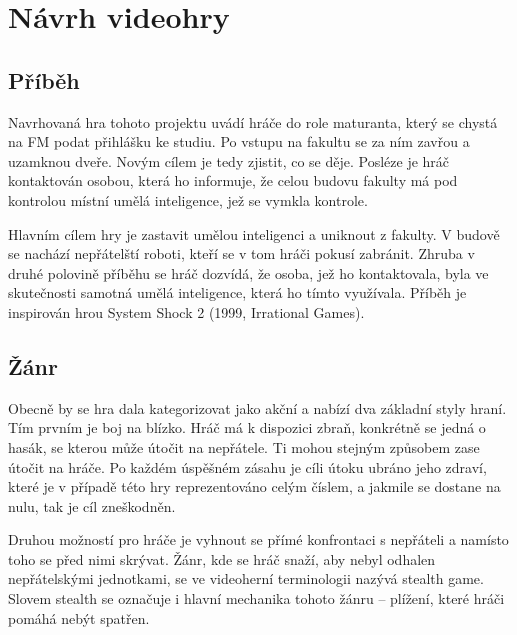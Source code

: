 \documentclass[FM,Proj]{tulthesis}
\begin{document}
	\chapter{Návrh videohry}
	
	\section{Příběh}
	
	Navrhovaná hra tohoto projektu uvádí hráče do role maturanta, který se chystá na FM podat přihlášku ke studiu. Po vstupu na fakultu se za ním zavřou a uzamknou dveře. Novým cílem je tedy zjistit, co se děje. Posléze je hráč kontaktován osobou, která ho informuje, že celou budovu fakulty má pod kontrolou místní umělá inteligence, jež se vymkla kontrole.
	
	Hlavním cílem hry je zastavit umělou inteligenci a uniknout z fakulty. V budově se nachází nepřátelští roboti, kteří se v tom hráči pokusí zabránit. Zhruba v druhé polovině příběhu se hráč dozvídá, že osoba, jež ho kontaktovala, byla ve skutečnosti samotná umělá inteligence, která ho tímto využívala. Příběh je inspirován hrou System Shock 2 (1999, Irrational Games).
	
	\section{Žánr}
	
	Obecně by se hra dala kategorizovat jako akční a nabízí dva základní styly hraní. Tím prvním je boj na blízko. Hráč má k dispozici zbraň, konkrétně se jedná o hasák, se kterou může útočit na nepřátele. Ti mohou stejným způsobem zase útočit na hráče. Po každém úspěšném zásahu je cíli útoku ubráno jeho zdraví, které je v případě této hry reprezentováno celým číslem, a jakmile se dostane na nulu, tak je cíl zneškodněn.
	
	Druhou možností pro hráče je vyhnout se přímé konfrontaci s nepřáteli a namísto toho se před nimi skrývat. Žánr, kde se hráč snaží, aby nebyl odhalen nepřátelskými jednotkami, se ve videoherní terminologii nazývá stealth game. Slovem stealth se označuje i hlavní mechanika tohoto žánru – plížení, které hráči pomáhá nebýt spatřen.
	
\end{document}
